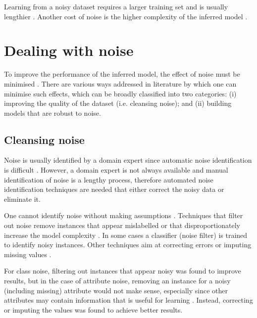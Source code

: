 Learning from a noisy dataset requires a larger training set \citep{frenay2014comprehensive, frenay2014classification} and is usually lengthier \citep{garcia2013}. Another cost of noise is the higher complexity of the inferred model \citep{garcia2013, frenay2014comprehensive, frenay2014classification}.

\section{Dealing with noise}\label{sec:noise_dealing}

To improve the performance of the inferred model, the effect of noise must be minimised \citep{zhu2004class}. There are various ways addressed in literature by which one can minimise such effects, which can be broadly classified into two categories: (i) improving the quality of the dataset (i.e. cleansing noise); and (ii) building models that are robust to noise.

\subsection{Cleansing noise}\label{sec:noise_cleansing}

Noise is usually identified by a domain expert since automatic noise identification is difficult \citep{garcia2013}.  However, a domain expert is not always available and manual identification of noise is a lengthy process, therefore automated noise identification techniques are needed that either correct the noisy data or eliminate it. 

One cannot identify noise without making assumptions \citep{frenay2014classification}. Techniques that filter out noise remove instances that appear mislabelled or that disproportionately increase the model complexity \citep{frenay2014comprehensive}.  In some cases a classifier (noise filter) is trained to identify noisy instances. Other techniques aim at correcting errors or imputing missing values \citep{zhu2004class}.

For class noise, filtering out instances that appear noisy was found to improve results, but in the case of attribute noise, removing an instance for a noisy (including missing) attribute would not make sense, especially since other attributes may contain information that is useful for learning \citep{zhu2004class}.  Instead, correcting or imputing the values was found to achieve better results. 

